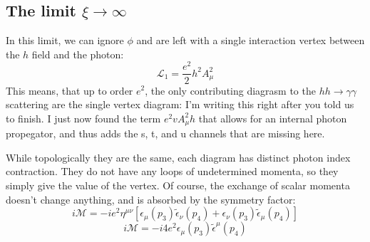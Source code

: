 \documentclass{article}
\begin{document}
\subsection{The limit $\xi \rightarrow \infty$}
In this limit, we can ignore $\phi$ and are left with a single interaction vertex between the $h$ field and the photon:
\begin{equation}
    \mathcal{L}_1 = \frac{e^2}{2}h^2A_\mu^2
\end{equation}
This means, that up to order $e^2$, the only contributing diagrasm to the $hh\rightarrow\gamma\gamma$ scattering are the single vertex diagram:
\newline
I'm writing this right after you told us to finish. I just now found the term $e^2vA_\mu^2 h$ that allows for an internal photon propegator, and thus adds the s, t, and u channels that are missing here.
\begin{center}
\end{center}
While topologically they are the same, each diagram has distinct photon index contraction. They do not have any loops of undetermined momenta, so they simply give the value of the vertex. Of course, the exchange of scalar momenta doesn't change anything, and is absorbed by the symmetry factor:
\begin{equation}
    i\mathcal{M} = -ie^2\eta^{\mu\nu}\left[
        \epsilon_\mu(p_3)\tilde{\epsilon}_\nu(p_4)
        + \epsilon_\nu(p_3)\tilde{\epsilon}_\mu(p_4)
    \right]
\end{equation}
\begin{equation}
    i\mathcal{M} = -i4e^2\epsilon_\mu(p_3)\tilde{\epsilon}^\mu(p_4)
\end{equation}
\end{document}
